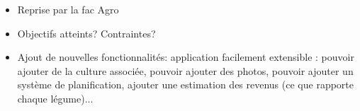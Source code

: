 

\begin{itemize}
    \item Reprise par la fac Agro
    \item Objectifs atteints? Contraintes?
    \item Ajout de nouvelles fonctionnalités: application facilement extensible : pouvoir ajouter de la culture associée, pouvoir ajouter des photos, pouvoir ajouter un système de planification, ajouter une estimation des revenus (ce que rapporte chaque légume)...
\end{itemize}